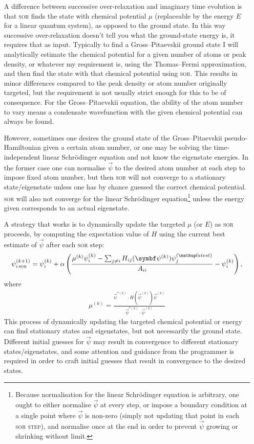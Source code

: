 A difference between successive over-relaxation and imaginary time evolution is that \textsc{sor} finds the state with chemical potential $\mu$ (replaceable by the energy $E$ for a linear quantum system), as opposed to the ground state. In this way successive over-relaxation doesn't tell you what the ground-state energy is, it requires that as input. Typically to find a Gross--Pitaevskii ground state I will analytically estimate the chemical potential for a given number of atoms or peak density, or whatever my requirement is, using the Thomas--Fermi approximation, and then find the state with that chemical potential using \textsc{sor}. This results in minor differences compared to the peak density or atom number originally targeted, but the requirement is not usually strict enough for this to be of consequence. For the Gross--Pitaevskii equation, the ability of the atom number to vary means a condensate wavefunction with the given chemical potential can always be found.

However, sometimes one desires the ground state of the Gross--Pitaevskii pseudo-Hamiltonian given a certain atom number, or one may be solving the time-independent linear Schr\"odinger equation and not know the eigenstate energies. In the former case one can normalise $\vec\psi$ to the desired atom number at each step to impose fixed atom number, but then \textsc{sor} will not converge to a stationary state/eigenstate unless one has by chance guessed the correct chemical potential. \textsc{sor} will also not converge for the linear Schr\"odinger equation\footnote{Because normalisation for the linear Schr\"odinger equation is arbitrary, one ought to either normalise $\vec\psi$ at every step, or impose a boundary condition at a single point where $\vec\psi$ is non-zero (simply not updating that point in each \textsc{sor step}), and normalise once at the end in order to prevent $\vec\psi$ growing or shrinking without limit.} unless the energy given corresponds to an actual eigenstate.

A strategy that works is to dynamically update the targeted $\mu$ (or $E$) as \textsc{sor} proceeds, by computing the expectation value of $H$ using the current best estimate of $\vec\psi$ after each \textsc{sor} step:
\begin{align}
\psi^{(k+1)}_{i\,\textsc{sor}} = \psi^{(k)}_i + \alpha\left(\frac{\mu^{(k)}\psi^{(k)}_i - \sum_{j\neq i} H_{ij}(\vec\psi^{(k)})\psi^{(\up{latest})}_j}{A_{ii}} - \psi^{(k)}_i\right),
\end{align}
where
\begin{align}
\mu^{(k)} = \frac{\vec\psi^{*(k)}\cdot H(\vec\psi^{(k)})\vec\psi^{(k)}}
{\vec\psi^{*(k)}\cdot\vec\psi^{(k)}}
\end{align}
This process of dynamically updating the targeted chemical potential or energy can find stationary states and eigenstates, but not necessarily the ground state. Different initial guesses for $\vec\psi$ may result in convergence to different stationary states/eigenstates, and some attention and guidance from the programmer is required in order to craft initial guesses that result in convergence to the desired states.

